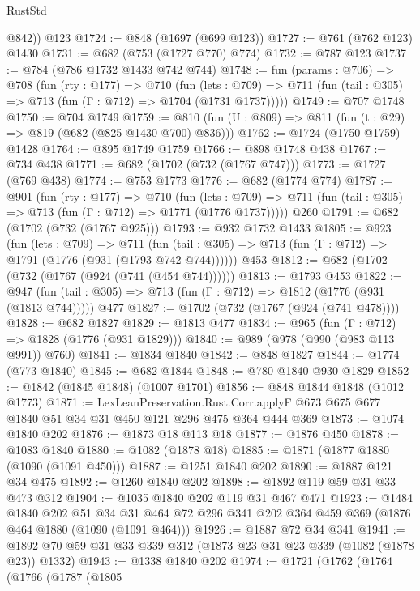\begin{lexlean}{RustStd}
\begin{coremodule}
        @842))
    @123
@1724 := @848 (@1697 (@699 @123))
@1727 := @761 (@762 @123) @1430
@1731 := @682 (@753 (@1727 @770) @774)
@1732 := @787 @123
@1737 := @784 (@786 @1732 @1433 @742 @744)
@1748 := fun (params : @706) =>
  @708
    (fun (rty : @177) =>
    @710
      (fun (lets : @709) =>
      @711 (fun (tail : @305) => @713 (fun (Γ : @712) => @1704 (@1731 @1737)))))
@1749 := @707 @1748
@1750 := @704 @1749
@1759 := @810 (fun (U : @809) => @811 (fun (t : @29) => @819 (@682 (@825 @1430 @700) @836)))
@1762 := @1724 (@1750 @1759) @1428
@1764 := @895 @1749 @1759
@1766 := @898 @1748 @438
@1767 := @734 @438
@1771 := @682 (@1702 (@732 (@1767 @747)))
@1773 := @1727 (@769 @438)
@1774 := @753 @1773
@1776 := @682 (@1774 @774)
@1787 := @901
    (fun (rty : @177) =>
    @710
      (fun (lets : @709) =>
      @711 (fun (tail : @305) => @713 (fun (Γ : @712) => @1771 (@1776 @1737)))))
    @260
@1791 := @682 (@1702 (@732 (@1767 @925)))
@1793 := @932 @1732 @1433
@1805 := @923
    (fun (lets : @709) =>
    @711 (fun (tail : @305) => @713 (fun (Γ : @712) => @1791 (@1776 (@931 (@1793 @742 @744))))))
    @453
@1812 := @682 (@1702 (@732 (@1767 (@924 (@741 (@454 @744))))))
@1813 := @1793 @453
@1822 := @947 (fun (tail : @305) => @713 (fun (Γ : @712) => @1812 (@1776 (@931 (@1813 @744))))) @477
@1827 := @1702 (@732 (@1767 (@924 (@741 @478))))
@1828 := @682 @1827
@1829 := @1813 @477
@1834 := @965 (fun (Γ : @712) => @1828 (@1776 (@931 @1829)))
@1840 := @989 (@978 (@990 (@983 @113 @991)) @760)
@1841 := @1834 @1840
@1842 := @848 @1827
@1844 := @1774 (@773 @1840)
@1845 := @682 @1844
@1848 := @780 @1840 @930 @1829
@1852 := @1842 (@1845 @1848) (@1007 @1701)
@1856 := @848 @1844 @1848 (@1012 @1773)
@1871 := LexLeanPreservation.Rust.Corr.applyF
    @673
    @675
    @677
    @1840
    @51
    @34
    @31
    @450
    @121
    @296
    @475
    @364
    @444
    @369
@1873 := @1074 @1840 @202
@1876 := @1873 @18 @113 @18
@1877 := @1876 @450
@1878 := @1083 @1840
@1880 := @1082 (@1878 @18)
@1885 := @1871 (@1877 @1880 (@1090 (@1091 @450)))
@1887 := @1251 @1840 @202
@1890 := @1887 @121 @34 @475
@1892 := @1260 @1840 @202
@1898 := @1892 @119 @59 @31 @33 @473 @312
@1904 := @1035 @1840 @202 @119 @31 @467 @471
@1923 := @1484
    @1840
    @202
    @51
    @34
    @31
    @464
    @72
    @296
    @341
    @202
    @364
    @459
    @369
    (@1876 @464 @1880 (@1090 (@1091 @464)))
@1926 := @1887 @72 @34 @341
@1941 := @1892 @70 @59 @31 @33 @339 @312 (@1873 @23 @31 @23 @339 (@1082 (@1878 @23)) @1332)
@1943 := @1338 @1840 @202
@1974 := @1721
    (@1762
      (@1764
        (@1766
          (@1787
            (@1805

\end{coremodule}
\end{lexlean}
